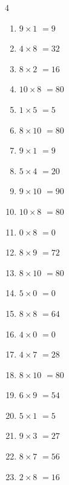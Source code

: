 \begin{multicols}{4}
\begin{enumerate}
  \item $9\times 1$
        $=9$

  \item $4\times 8$
        $=32$

  \item $8\times 2$
        $=16$

  \item $10\times 8$
        $=80$

  \item $1\times 5$
        $=5$

  \item $8\times 10$
        $=80$

  \item $9\times 1$
        $=9$

  \item $5\times 4$
        $=20$

  \item $9\times 10$
        $=90$

  \item $10\times 8$
        $=80$

  \item $0\times 8$
        $=0$

  \item $8\times 9$
        $=72$

  \item $8\times 10$
        $=80$

  \item $5\times 0$
        $=0$

  \item $8\times 8$
        $=64$

  \item $4\times 0$
        $=0$

\columnbreak %

  \item $4\times 7$
        $=28$

  \item $8\times 10$
        $=80$

  \item $6\times 9$
        $=54$

  \item $5\times 1$
        $=5$

  \item $9\times 3$
        $=27$

  \item $8\times 7$
        $=56$

  \item $2\times 8$
        $=16$


\end{enumerate}
\end{multicols}
